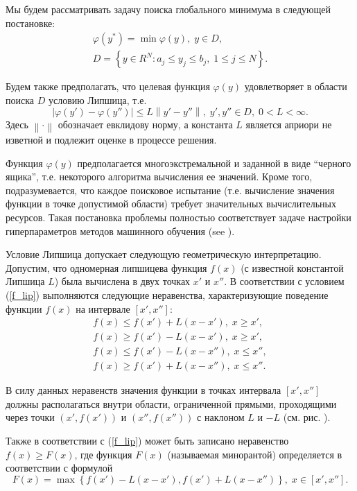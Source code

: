 \documentclass[preprint,12pt]{elsarticle}
\begin{document}
Мы будем рассматривать задачу поиска глобального минимума в следующей постановке:
\begin{gather}
	\varphi(y^*) = \min \varphi(y), \; y \in D, \label{f_func} \\
	D = \left\{y \in R^N : a_j \leq y_j \leq b_j , \; 1 \leq j \leq N \right\}. \label{f_D}
\end{gather}

Будем также предполагать, что целевая функция $\varphi(y)$ удовлетворяет в области поиска $D$ условию Липшица, т.е.
\begin{equation} \label{f_lip}
	\left| \varphi(y')-\varphi(y'') \right| \leq L\left\| y' - y''  \right\| , \; y',y'' \in D, \; 0<L<\infty.
\end{equation}
Здесь $ \left\| \cdot \right\|$ обозначает евклидову норму, а константа $L$ является априори не изветной и подлежит оценке в процессе решения. 

Функция $\varphi(y)$ предполагается многоэкстремальной и заданной в виде ``черного ящика'', т.е. некоторого алгоритма вычисления ее значений. Кроме того, подразумевается, что каждое поисковое испытание (т.е. вычисление значения функции в точке допустимой области) требует значительных вычислительных ресурсов. Такая постановка проблемы полностью соответствует задаче настройки гиперпараметров методов машинного обучения (see ).

Условие Липшица допускает следующую геометрическую интерпретацию. Допустим, что одномерная липшицева функция $f(x)$ (с известной константой Липшица $L$) была вычислена в двух точках $x'$ и $x''$. В соответствии с условием (\ref{f_lip}) выполняются следующие неравенства, характеризующие поведение функции $f(x)$ на интервале $[x', x'']$:
\begin{gather*}
	f(x) \leq f(x') + L(x-x'), \; x \geq x',\\
	f(x) \geq f(x') - L(x-x'), \; x \geq x',\\
	f(x) \leq f(x') - L(x-x''), \; x \leq x'',\\
	f(x) \geq f(x') + L(x-x''), \; x \leq x''.
\end{gather*}

В силу данных неравенств значения функции в точках интервала $[x', x'']$ должны располагаться внутри области, ограниченной прямыми, проходящими через точки $(x', f(x'))$ и $(x'', f(x''))$ с наклоном $L$ и $-L$ (см. рис. ).

Также в соответствии с (\ref{f_lip}) может быть записано неравенство $f(x) \geq F(x)$, где функция $F(x)$ (называемая минорантой) определяется в соответствии с формулой
\[
F(x) = \max\left\{f(x') - L(x-x'),f(x') + L(x-x'')\right\}, \; x\in [x', x''].
\] 
\end{document}
